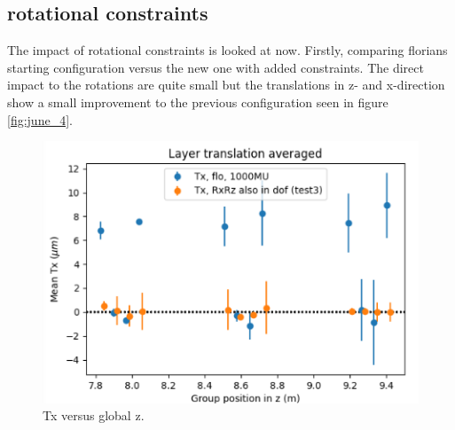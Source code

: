 \subsection{rotational constraints}
The impact of rotational constraints is looked at now. Firstly, comparing
florians starting configuration versus the new one with added constraints.
The direct impact to the rotations are quite small but the translations
in z- and x-direction show a small improvement to the previous configuration
seen in figure \ref{fig:june_4}.

\begin{figure}
  \centering
  \includegraphics[width=\textwidth]{plots/july_28/Tx.png}
  \caption{Tx versus global z.}
\end{figure}


